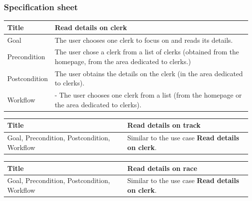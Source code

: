 \documentclass{beamer}
\begin{document}
\begin{frame}
    \frametitle{Specification sheet}
    \begin{table}
        \tiny
        \begin{tabular}{|p{2cm}|p{6cm}|}
        \hline  
        Title & \textbf{Read details on clerk} \\
        \hline
        Goal & The user chooses one clerk to focus on and reads its details. \\
        \hline
        Precondition & The user chose a clerk from a list of clerks (obtained from the homepage,
        from the area dedicated to clerks.)\\
        \hline
        Postcondition & The user obtains the details on the clerk (in the area dedicated to clerks). \\
        \hline
        Workflow &
        - The user chooses one clerk from a list (from the homepage or the area dedicated to clerks). \\
        \hline
        \end{tabular}
\end{table}

\begin{table}
    \tiny
    \begin{tabular}{|p{2cm}|p{6cm}|}
    \hline  
    Title & \textbf{Read details on track} \\
    \hline
    Goal, Precondition, Postcondition, Workflow & Similar to the use case \textbf{Read details on clerk}.\\
    \hline
    \end{tabular}
\end{table}

\begin{table}
    \tiny
    \begin{tabular}{|p{2cm}|p{6cm}|}
    \hline  
    Title & \textbf{Read details on race} \\
    \hline
    Goal, Precondition, Postcondition, Workflow & Similar to the use case \textbf{Read details on clerk}.\\
    \hline
    \end{tabular}
\end{table}
\end{frame}
\end{document}
